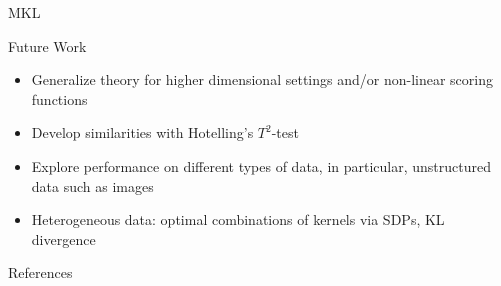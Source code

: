 \documentclass{beamer}
\begin{document}
\begin{frame}{MKL}
  \begin{center}
    \resizebox{10.0cm}{!}{
      
    }
  \end{center}
\end{frame}

\begin{frame}{Future Work}
  \begin{itemize}
  \item Generalize theory for higher dimensional settings and/or
    non-linear scoring functions \pause
  \item Develop similarities with Hotelling's $T^2$-test \pause
  \item Explore performance on different types of data, in particular,
    unstructured data such as images \pause
  \item Heterogeneous data: optimal combinations of kernels
    via SDPs, KL divergence \pause
  \end{itemize}
\end{frame}

\begin{frame}[allowframebreaks]{References}
  
  
\end{frame}
\end{document}
